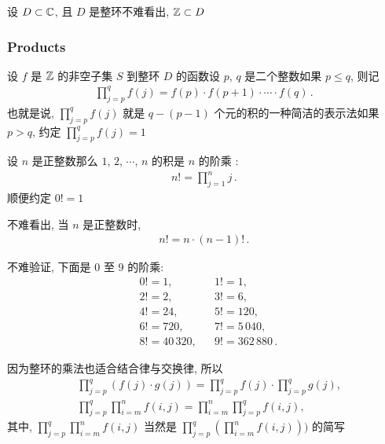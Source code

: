 \begin{example}
    设 $D \subset \mathbb{C}$, 且 $D$ 是整环\period 不难看出, $\mathbb{Z} \subset D$\period
\end{example}

\subsubsection*{Products}

\begin{definition}
    设 $f$ 是 $\mathbb{Z}$ 的非空子集 $S$ 到整环 $D$ 的函数\period 设 $p$, $q$ 是二个整数\period 如果 $p \leq q$, 则记
    \begin{align*}
        \prod_{j = p}^{q} f(j) = f(p) \cdot f(p + 1) \cdot \cdots \cdot f(q)\period
    \end{align*}
    也就是说, $\prod_{j = p}^{q} f(j)$ 就是 $q - (p - 1)$ 个元的积的一种简洁的表示法\period 如果 $p > q$, 约定 $\prod_{j = p}^{q} f(j) = 1$\period
\end{definition}

\begin{definition}
    设 $n$ 是正整数\period 那么 $1$, $2$, $\cdots$, $n$ 的积是 $n$ 的阶乘 :
    \begin{align*}
        n! = \prod_{j = 1}^{n} j \period
    \end{align*}
    顺便约定 $0! = 1$\period
\end{definition}

\begin{remark}
    不难看出, 当 $n$ 是正整数时,
    \begin{align*}
        n! = n \cdot (n-1)! \period
    \end{align*}
\end{remark}

\begin{example}
    不难验证, 下面是 $0$ 至 $9$ 的阶乘:
    \begin{align*}
         & 0! = 1,       &  & 1! = 1,               \\
         & 2! = 2,       &  & 3! = 6,               \\
         & 4! = 24,      &  & 5! = 120,             \\
         & 6! = 720,     &  & 7! = 5\,040,          \\
         & 8! = 40\,320, &  & 9! = 362\,880 \period
    \end{align*}
\end{example}

\begin{remark}
    因为整环的乘法也适合结合律与交换律, 所以
    \begin{align*}
         & \prod_{j=p}^{q} (f(j) \cdot g(j)) = \prod_{j=p}^{q} f(j) \cdot \prod_{j=p}^{q} g(j), \\
         & \prod_{j=p}^{q} \prod_{i=m}^{n} f(i,j) = \prod_{i=m}^{n} \prod_{j=p}^{q} f(i,j),
    \end{align*}
    其中, $\prod_{j=p}^{q} \prod_{i=m}^{n} f(i,j)$ 当然是 $\prod_{j=p}^{q} \left( \prod_{i=m}^{n} f(i,j) \right))$ 的简写\period
\end{remark}

